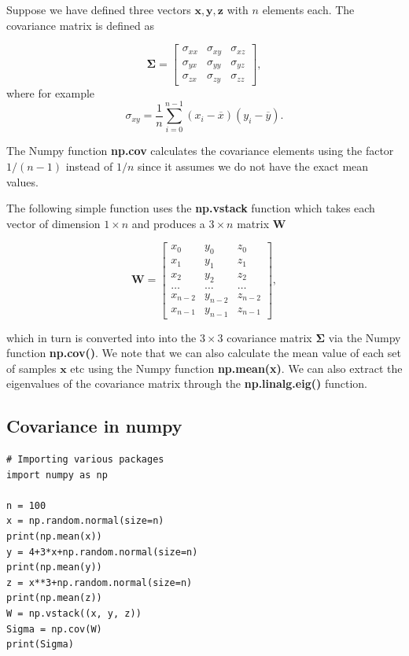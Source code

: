 \documentclass[%
oneside,                 %
final,                   %
10pt]{article}
\begin{document}
Suppose we have defined three vectors $\bm{x}, \bm{y}, \bm{z}$ with
$n$ elements each. The covariance matrix is defined as


\[
\bm{\Sigma} = \begin{bmatrix} \sigma_{xx} & \sigma_{xy} & \sigma_{xz} \\
                              \sigma_{yx} & \sigma_{yy} & \sigma_{yz} \\
                              \sigma_{zx} & \sigma_{zy} & \sigma_{zz}
             \end{bmatrix},
\]
where for example
\[
\sigma_{xy} =\frac{1}{n} \sum_{i=0}^{n-1}(x_i- \overline{x})(y_i- \overline{y}).
\]

The Numpy function \textbf{np.cov} calculates the covariance elements using
the factor $1/(n-1)$ instead of $1/n$ since it assumes we do not have
the exact mean values.

The following simple function uses the \textbf{np.vstack} function which
takes each vector of dimension $1\times n$ and produces a $3\times n$
matrix $\bm{W}$

\[
\bm{W} = \begin{bmatrix} x_0 & y_0 & z_0 \\
                          x_1 & y_1 & z_1 \\
                          x_2 & y_2 & z_2 \\
                          \dots & \dots & \dots \\
                          x_{n-2} & y_{n-2} & z_{n-2} \\
                          x_{n-1} & y_{n-1} & z_{n-1}
             \end{bmatrix},
\]

which in turn is converted into into the $3\times 3$ covariance matrix
$\bm{\Sigma}$ via the Numpy function \textbf{np.cov()}. We note that we can
also calculate the mean value of each set of samples $\bm{x}$ etc
using the Numpy function \textbf{np.mean(x)}. We can also extract the
eigenvalues of the covariance matrix through the \textbf{np.linalg.eig()}
function.


\subsection*{Covariance in numpy}

\begin{verbatim}
# Importing various packages
import numpy as np

n = 100
x = np.random.normal(size=n)
print(np.mean(x))
y = 4+3*x+np.random.normal(size=n)
print(np.mean(y))
z = x**3+np.random.normal(size=n)
print(np.mean(z))
W = np.vstack((x, y, z))
Sigma = np.cov(W)
print(Sigma)
\end{verbatim}
\end{document}
